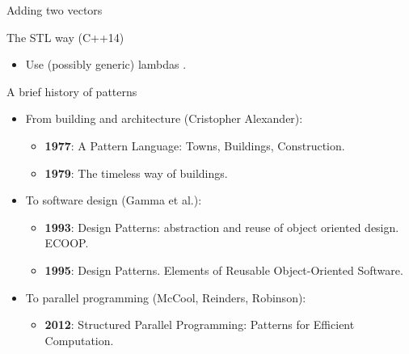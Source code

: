 \begin{frame}[t,fragile]{Adding two vectors}
\begin{block}{The STL way (C++14)}

\end{block}
\pause
\begin{itemize}
  \item Use (possibly generic) lambdas .
\end{itemize}
\end{frame}

\begin{frame}[t]{A brief history of patterns}
\begin{itemize}
\item From building and architecture (Cristopher Alexander):
\begin{itemize}
  \item \textbf{1977}: A Pattern Language: Towns, Buildings, Construction.
  \item \textbf{1979}: The timeless way of buildings.
\end{itemize}
\pause\vfill
\item To software design (Gamma et al.):
\begin{itemize}
  \item \textbf{1993}: Design Patterns: abstraction and reuse of object oriented design. ECOOP.
  \item \textbf{1995}: Design Patterns. Elements of Reusable Object-Oriented Software.
\end{itemize}
\pause\vfill
\item To parallel programming (McCool, Reinders, Robinson):
\begin{itemize}
  \item \textbf{2012}: Structured Parallel Programming: Patterns for Efficient Computation.
\end{itemize}
\end{itemize}
\end{frame}

